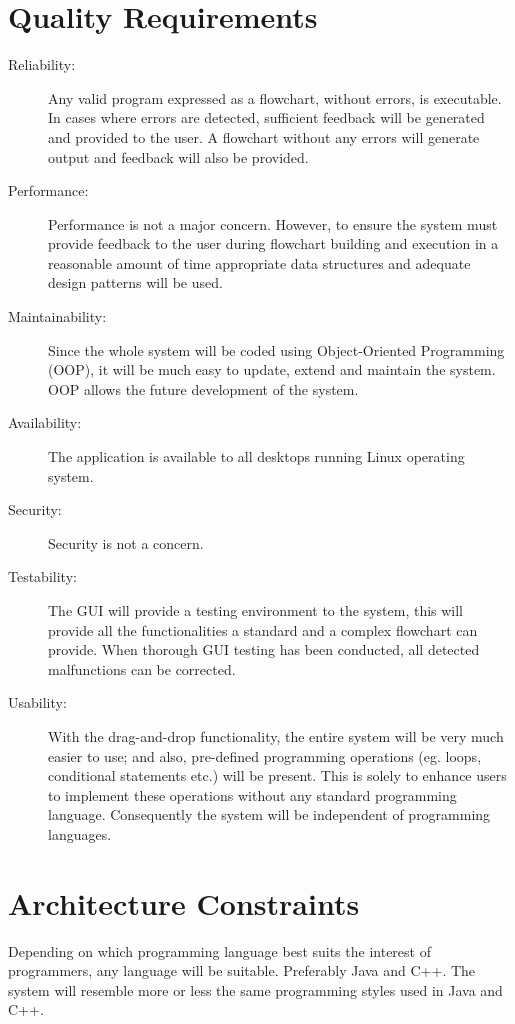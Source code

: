 \section{Quality Requirements}
\begin{description}
  \item[Reliability:]
  	Any valid program expressed as a flowchart, without errors, is executable. In cases where errors are detected, sufficient feedback will be generated and provided to the user. A flowchart without any errors will generate output and feedback will also be provided.
 

  \item[Performance:]
  Performance is not a major concern. However, to ensure the system must provide feedback to the user during flowchart building and execution in a reasonable amount of time appropriate data structures and adequate design patterns will be used.

  \item[Maintainability:] 
  Since the whole system will be coded using Object-Oriented Programming (OOP), it will be much easy to update, extend and maintain the system. OOP allows the future development of the system.

  \item[Availability:]
  The application is available to all desktops running Linux operating system.

  \item[Security:]
  Security is not a concern.

  \item[Testability:]
  The GUI will provide a testing environment to the system, this will provide all the functionalities a standard and a complex flowchart can provide. When thorough GUI testing has been conducted, all detected malfunctions can be corrected.

  \item[Usability:]
  With the drag-and-drop functionality, the entire system will be very much easier to use; and also, pre-defined programming operations (eg. loops, conditional statements etc.) will be present. This is solely to enhance users to implement these operations without any standard programming language. Consequently the system will be independent of programming languages.
  

\end{description}
\section{Architecture Constraints}
Depending on which programming language best suits the interest of programmers, any language will be suitable. Preferably Java and C++. The system will resemble more or less the same programming styles used in Java and C++.


